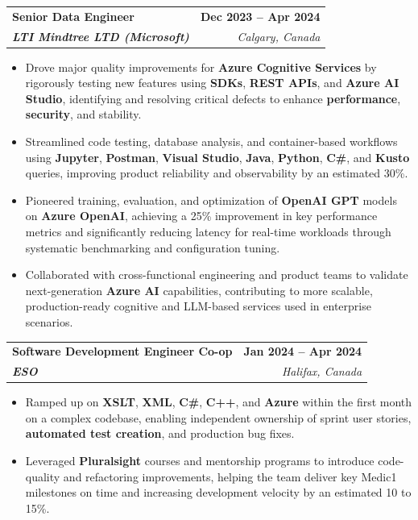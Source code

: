 \documentclass[letterpaper,11pt]{article}
\makeatletter
\newcommand{\resumeItem}[1]{
  \item\small{
    {#1 \vspace{-2pt}}
  }
}
\newcommand{\resumeSubheading}[4]{
  \vspace{-2pt}\item
    \begin{tabular*}{1.0\textwidth}[t]{l@{\extracolsep{\fill}}r}
      \textbf{#1} & \textbf{\small #2} \\
      \textit{\small#3} & \textit{\small #4} \\
    \end{tabular*}\vspace{-7pt}
}
\newcommand{\resumeItemListStart}{\begin{itemize}}
\newcommand{\resumeItemListEnd}{\end{itemize}\vspace{-5pt}}
\makeatother
\begin{document}
    \resumeSubheading
      {\textbf{Senior Data Engineer}}{\textbf{Dec 2023 -- Apr 2024}}
      {\textbf{LTI Mindtree LTD (Microsoft)}}{Calgary, Canada}
      \resumeItemListStart
        \resumeItem{Drove major quality improvements for \textbf{Azure Cognitive Services} by rigorously testing new features using \textbf{SDKs}, \textbf{REST APIs}, and \textbf{Azure AI Studio}, identifying and resolving critical defects to enhance \textbf{performance}, \textbf{security}, and stability.}
        \resumeItem{Streamlined code testing, database analysis, and container-based workflows using \textbf{Jupyter}, \textbf{Postman}, \textbf{Visual Studio}, \textbf{Java}, \textbf{Python}, \textbf{C\#}, and \textbf{Kusto} queries, improving product reliability and observability by an estimated 30\%.}
        \resumeItem{Pioneered training, evaluation, and optimization of \textbf{OpenAI GPT} models on \textbf{Azure OpenAI}, achieving a 25\% improvement in key performance metrics and significantly reducing latency for real-time workloads through systematic benchmarking and configuration tuning.}
        \resumeItem{Collaborated with cross-functional engineering and product teams to validate next-generation \textbf{Azure AI} capabilities, contributing to more scalable, production-ready cognitive and LLM-based services used in enterprise scenarios.}
      \resumeItemListEnd
    
    \resumeSubheading
      {\textbf{Software Development Engineer Co-op}}{\textbf{Jan 2024 -- Apr 2024}}
      {\textbf{ESO}}{Halifax, Canada}
      \resumeItemListStart
        \resumeItem{Ramped up on \textbf{XSLT}, \textbf{XML}, \textbf{C\#}, \textbf{C++}, and \textbf{Azure} within the first month on a complex codebase, enabling independent ownership of sprint user stories, \textbf{automated test creation}, and production bug fixes.}
        \resumeItem{Leveraged \textbf{Pluralsight} courses and mentorship programs to introduce code-quality and refactoring improvements, helping the team deliver key Medic1 milestones on time and increasing development velocity by an estimated 10 to 15\%.}
      \resumeItemListEnd
\end{document}

